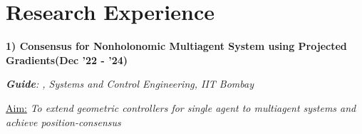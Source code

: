 \documentclass[10pt,letterpaper,sans]{moderncv}        %
\newcommand\x{1}
\newcommand\y{4}
\begin{document}
\section{Research Experience}
\vspace{-3 pt}

\vspace{\y pt}

\textbf{1) Consensus for Nonholonomic Multiagent System using Projected Gradients}\hfill{\textbf{(Dec '22 - '24)}}

\textit{\textbf{Guide}: , Systems and Control Engineering, IIT Bombay}


\textcolor{mygray}{
\underline{Aim:} \textit{%
To extend geometric controllers for single agent to multiagent systems and achieve position-consensus}
}\vspace{\x pt}%
\end{document}

